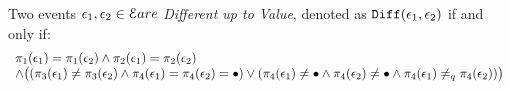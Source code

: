 %
\begin{defn}
  Two events $\mathtt{\epsilon}_1, \mathtt{\epsilon}_2 \in \mathcal{E} are $ \emph{Different up to Value}, 
  denoted as $\mathtt{Diff}(\mathtt{\epsilon}_1, \mathtt{\epsilon}_2)$ if and only if:
  \[
    \begin{array}{l}
  \pi_1(\mathtt{\epsilon}_1) = \pi_1(\mathtt{\epsilon}_2) 
  \land  
  \pi_2(\mathtt{\epsilon}_1) = \pi_2(\mathtt{\epsilon}_2) \\
  \land  
  \big(
    (\pi_3(\mathtt{\epsilon}_1) \neq \pi_3(\mathtt{\epsilon}_2)
  \land 
  \pi_{4}(\mathtt{\epsilon}_1) = \pi_{4}(\mathtt{\epsilon}_2) = \bullet )
  \lor 
  (\pi_4(\mathtt{\epsilon}_1) \neq \bullet
  \land 
  \pi_4(\mathtt{\epsilon}_2) \neq \bullet
  \land 
  \pi_{4}(\mathtt{\epsilon}_1) \neq_q \pi_{4}(\mathtt{\epsilon}_2)) 
  \big)
  \end{array}
  \]
  \end{defn}
%
%

